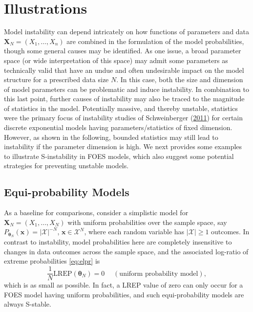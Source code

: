 \documentclass[]{article}
\theoremstyle{definition}
\newcommand{\REP}{\mathrm{LREP}}
\begin{document}
\section{Illustrations}\label{illustrations}

Model instability can depend intricately on how functions of parameters
and data \(\boldsymbol X_N=(X_1,\ldots,X_n)\) are combined in the
formulation of the model probabilities, though some general causes may
be identified. As one issue, a broad parameter space (or wide
interpretation of this space) may admit some parameters as technically
valid that have an undue and often undesirable impact on the model
structure for a prescribed data size \(N\). In this case, both the size
and dimension of model parameters can be problematic and induce
instability. In combination to this last point, further causes of
instability may also be traced to the magnitude of statistics in the
model. Potentially massive, and thereby unstable, statistics were the
primary focus of instability studies of Schweinberger
(\protect\hyperlink{ref-schweinberger2011instability}{2011}) for certain
discrete exponential models having parameters/statistics of fixed
dimension. However, as shown in the following, bounded statistics may
still lead to instability if the parameter dimension is high. We next
provides some examples to illustrate S-instability in FOES models, which
also suggest some potential strategies for preventing unstable models.

\subsection{Equi-probability Models}\label{equi-probability-models}

As a baseline for comparisons, consider a simplistic model for
\(\boldsymbol X_N=(X_1,\ldots,X_N)\) with uniform probabilities over the
sample space, say
\(P_{\boldsymbol \theta_N}(\boldsymbol x)= |\mathcal{X}|^{-N}\),
\(\boldsymbol x \in \mathcal{X}^N\), where each random variable has
\(|\mathcal{X}| \geq 1\) outcomes. In contrast to instability, model
probabilities here are completely insensitive to changes in data
outcomes across the sample space, and the associated log-ratio of
extreme probabilities \eqref{eq:elpr} is \[
\frac{1}{N} \REP(\boldsymbol \theta_N)=0\quad \;(\mbox{uniform probability model}),
\] which is as small as possible. In fact, a LREP value of zero can only
occur for a FOES model having uniform probabilities, and such
equi-probability models are always S-stable.
\end{document}
